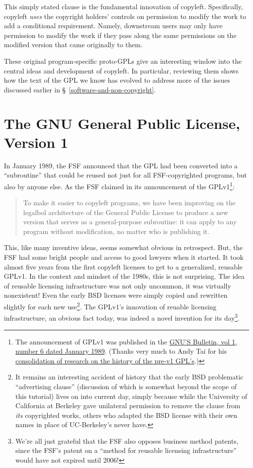 This simply stated clause is the fundamental innovation of copyleft.
Specifically, copyleft \textit{uses} the copyright holders' controls on
permission to modify the work to add a conditional requirement.  Namely,
downstream users may only have permission to modify  the work if they pass
along the same permissions on the modified version that came originally to
them.

These original program-specific proto-GPLs give an interesting window into
the central ideas and development of copyleft.  In particular, reviewing them
shows how the text of the GPL we know has evolved to address more of the
issues discussed earlier in \S~\ref{software-and-non-copyright}.

\section{The GNU General Public License, Version 1}
\label{GPLv1}

In January 1989, the FSF announced that the GPL had been converted into a
``subroutine'' that could be reused not just for all FSF-copyrighted
programs, but also by anyone else.  As the FSF claimed in its announcement of
the GPLv1\footnote{The announcement of GPLv1 was published in the
  \href{http://www.gnu.org/bulletins/bull6.html\#SEC8}{GNU'S Bulletin, vol 1,
    number 6 dated January 1989}.  (Thanks very much to Andy Tai for his
  \href{http://www.free-soft.org/gpl_history/}{consolidation of research on
    the history of the pre-v1 GPL's}.)}:
\begin{quotation}
To make it easier to copyleft programs, we have been improving on the
legalbol architecture of the General Public License to produce a new version
that serves as a general-purpose subroutine: it can apply to any program
without modification, no matter who is publishing it.
\end{quotation}

This, like many inventive ideas, seems somewhat obvious in retrospect.  But,
the FSF had some bright people and access to good lawyers when it started.
It took almost five years from the first copyleft licenses to get to a
generalized, reusable GPLv1.  In the context and mindset of the 1980s, this
is not surprising.  The idea of reusable licensing infrastructure was not
only uncommon, it was virtually nonexistent!  Even the early BSD licenses
were simply copied and rewritten slightly for each new use\footnote{It
  remains an interesting accident of history that the early BSD problematic
  ``advertising clause'' (discussion of which is somewhat beyond the scope of
  this tutorial) lives on into current day, simply because while the
  University of California at Berkeley gave unilateral permission to remove
  the clause from \textit{its} copyrighted works, others who adapted the BSD
  license with their own names in place of UC-Berkeley's never have.}.  The
GPLv1's innovation of reuable licensing infrastructure, an obvious fact
today, was indeed a novel invention for its day\footnote{We're all just
  grateful that the FSF also opposes business method patents, since the FSF's
  patent on a ``method for reusable licensing infrastructure'' would have
  not expired until 2006!}.

